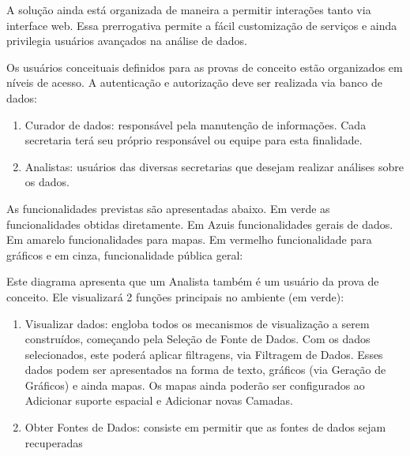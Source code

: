 \documentclass[letterpaper,10pt,brazil]{sphinxmanual}
\let\sphinxpxdimen\pdfpxdimen\else\newdimen\sphinxpxdimen
\begin{document}
\sphinxAtStartPar
A solução ainda está organizada de maneira a permitir interações tanto via interface web. Essa prerrogativa permite a fácil customização de serviços e ainda privilegia usuários avançados na análise de dados.

\sphinxAtStartPar
Os usuários conceituais definidos para as provas de conceito estão organizados em níveis de acesso. A autenticação e autorização deve ser realizada via banco de dados:
\begin{enumerate}
%
\item {} 
\sphinxAtStartPar
Curador de dados: responsável pela manutenção de informações. Cada secretaria terá seu próprio responsável ou equipe para esta finalidade.

\item {} 
\sphinxAtStartPar
Analistas: usuários das diversas secretarias que desejam realizar análises sobre os dados.

\end{enumerate}

\sphinxAtStartPar
As funcionalidades previstas são apresentadas abaixo.
Em verde as funcionalidades obtidas diretamente. Em Azuis funcionalidades gerais de dados. Em amarelo funcionalidades para mapas.
Em vermelho funcionalidade para gráficos e em cinza, funcionalidade pública geral:

\noindent\sphinxincludegraphics[width=500\sphinxpxdimen]{{casos}.png}

\sphinxAtStartPar
Este diagrama apresenta que um Analista também é um usuário da prova de conceito.
Ele visualizará 2 funções principais no ambiente (em verde):
\begin{enumerate}
%
\item {} 
\sphinxAtStartPar
Visualizar dados: engloba todos os mecanismos de visualização a serem construídos, começando pela Seleção de Fonte de Dados. Com os dados selecionados, este poderá aplicar filtragens, via Filtragem de Dados. Esses dados podem ser apresentados na forma de texto, gráficos (via Geração de Gráficos) e ainda mapas. Os mapas ainda poderão ser configurados ao Adicionar suporte espacial e Adicionar novas Camadas.

\item {} 
\sphinxAtStartPar
Obter Fontes de Dados: consiste em permitir que as fontes de dados sejam recuperadas

\end{enumerate}
\end{document}
